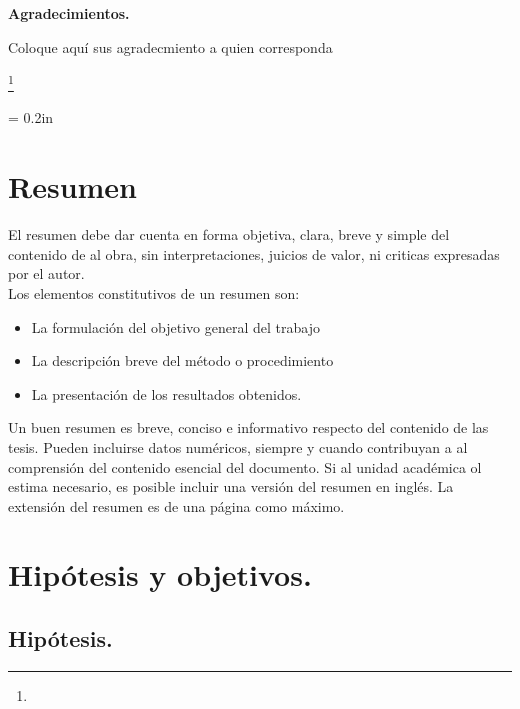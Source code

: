 \documentclass[12pt,fleqn]{article} %
\numberwithin{equation}{section}
\newcommand\blfootnote[1]{
  \begingroup
  \renewcommand\thefootnote{}\footnote{#1}
  \addtocounter{footnote}{-1}
  \endgroup
}
\begin{document}

\begin{flushright}
\makebox[0pt][b]{}
\end{flushright}

\vspace{40pt}
\begin{center}



{\bf Agradecimientos.}
\end{center}
Coloque aqu\'i sus agradecmiento a quien corresponda 
{\em }

\blfootnote{ }


\parskip = 0.2in

\pagebreak
\section{Resumen}
El resumen debe dar cuenta en forma objetiva, clara, breve y simple del contenido de al obra, sin interpretaciones, juicios de valor, ni criticas expresadas por el autor.\\
Los elementos constitutivos de un resumen son:\\
\begin{itemize}
    \item La formulación del objetivo general del trabajo
\item La descripción breve del método o procedimiento  
\item La presentación de los resultados obtenidos.
\end{itemize}

Un buen resumen es breve, conciso e informativo respecto del contenido de las tesis. Pueden incluirse datos numéricos, siempre y cuando contribuyan a al comprensión del contenido esencial del documento. Si al unidad académica ol estima necesario, es posible incluir una versión del resumen en inglés. La extensión del resumen es de una página como máximo.\cite{Ambrose2010}


\section{Hipótesis y objetivos.}

        \subsection{Hipótesis.}
\end{document}
